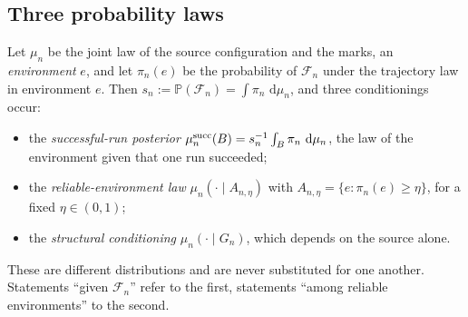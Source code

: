 \documentclass[11pt,letterpaper]{article}
\theoremstyle{plain}
\theoremstyle{definition}
\theoremstyle{remark}
\numberwithin{equation}{section}
\newcommand{\PP}{\mathbb P}
\newcommand{\cF}{\mathcal F}
\newcommand{\dd}{\,\mathrm d}
\begin{document}
\subsection{Three probability laws}\label{sec:laws}
Let $\mu_n$ be the joint law of the source configuration and the marks, an \emph{environment} $e$, and let $\pi_n(e)$ be the probability of $\cF_n$ under the trajectory law in environment $e$. Then $s_n:=\PP(\cF_n)=\int\pi_n\,\dd\mu_n$, and three conditionings occur:
\begin{itemize}
\item the \emph{successful-run posterior} $\mu_n^{\rm succ}(B)=s_n^{-1}\int_B\pi_n\,\dd\mu_n$, the law of the environment given that one run succeeded;
\item the \emph{reliable-environment law} $\mu_n(\cdot\mid A_{n,\eta})$ with $A_{n,\eta}=\{e:\pi_n(e)\ge\eta\}$, for a fixed $\eta\in(0,1)$;
\item the \emph{structural conditioning} $\mu_n(\cdot\mid G_n)$, which depends on the source alone.
\end{itemize}
These are different distributions and are never substituted for one another. Statements ``given $\cF_n$'' refer to the first, statements ``among reliable environments'' to the second.
\end{document}
